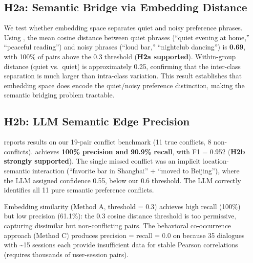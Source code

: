\subsection{H2a: Semantic Bridge via Embedding Distance}
\label{sec:results:embedding}

We test whether embedding space separates quiet and noisy preference phrases. Using \miniLM, the mean cosine distance between quiet phrases (\eg ``quiet evening at home,'' ``peaceful reading'') and noisy phrases (\eg ``loud bar,'' ``nightclub dancing'') is \textbf{0.69}, with 100\% of pairs above the 0.3 threshold (\textbf{H2a supported}). Within-group distance (quiet vs.\ quiet) is approximately 0.25, confirming that the inter-class separation is much larger than intra-class variation. This result establishes that embedding space does encode the quiet/noisy preference distinction, making the semantic bridging problem tractable.

\subsection{H2b: LLM Semantic Edge Precision}
\label{sec:results:llm}

 reports results on our 19-pair conflict benchmark (11 true conflicts, 8 non-conflicts). \gptfouromini achieves \textbf{100\% precision and 90.9\% recall}, with F1 = 0.952 (\textbf{H2b strongly supported}). The single missed conflict was an implicit location-semantic interaction (``favorite bar in Shanghai'' + ``moved to Beijing''), where the LLM assigned confidence 0.55, below our 0.6 threshold. The LLM correctly identifies all 11 pure semantic preference conflicts.

Embedding similarity (Method A, threshold = 0.3) achieves high recall (100\%) but low precision (61.1\%): the 0.3 cosine distance threshold is too permissive, capturing dissimilar but non-conflicting pairs. The behavioral co-occurrence approach (Method C) produces precision = recall = 0.0 on \locomo because 35 dialogues with \textasciitilde{}15 sessions each provide insufficient data for stable Pearson correlations (requires thousands of user-session pairs).

